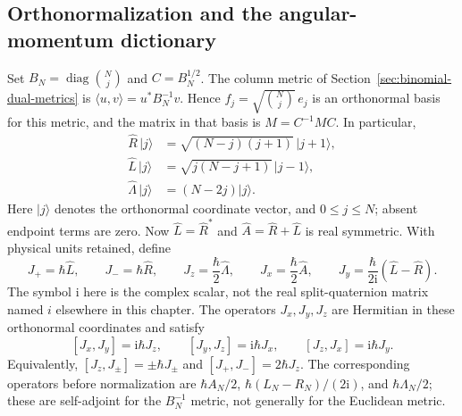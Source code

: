 \subsection{Orthonormalization and the angular-momentum dictionary}
Set $B_N=\operatorname{diag}\binom Nj$ and $C=B_N^{1/2}$. The column metric of Section~\ref{sec:binomial-dual-metrics} is $\langle u,v\rangle=u^*B_N^{-1}v$. Hence $f_j=\sqrt{\binom Nj}\,e_j$ is an orthonormal basis for this metric, and the matrix in that basis is $\widehat M=C^{-1}MC$. In particular,
\begin{align*}
\widehat R\,|j\rangle&=\sqrt{(N-j)(j+1)}\,|j+1\rangle,\\
\widehat L\,|j\rangle&=\sqrt{j(N-j+1)}\,|j-1\rangle,\\
\widehat\Lambda\,|j\rangle&=(N-2j)|j\rangle.
\end{align*}
Here $|j\rangle$ denotes the orthonormal coordinate vector, and $0\le j\le N$; absent endpoint terms are zero. Now $\widehat L=\widehat R^*$ and $\widehat A=\widehat R+\widehat L$ is real symmetric. With physical units retained, define
\begin{equation}\label{eq:angular-dictionary}
J_+=\hbar\widehat L,\qquad J_-=\hbar\widehat R,\qquad
J_z=\frac\hbar2\widehat\Lambda,\qquad
J_x=\frac\hbar2\widehat A,\qquad
J_y=\frac{\hbar}{2\mathrm i}(\widehat L-\widehat R).
\end{equation}
The symbol $\mathrm i$ here is the complex scalar, not the real split-quaternion matrix named $i$ elsewhere in this chapter. The operators $J_x,J_y,J_z$ are Hermitian in these orthonormal coordinates and satisfy
\[
[J_x,J_y]=\mathrm i\hbar J_z,\qquad
[J_y,J_z]=\mathrm i\hbar J_x,\qquad
[J_z,J_x]=\mathrm i\hbar J_y.
\]
Equivalently, $[J_z,J_\pm]=\pm\hbar J_\pm$ and $[J_+,J_-]=2\hbar J_z$.
The corresponding operators before normalization are $\hbar A_N/2$, $\hbar(L_N-R_N)/(2\mathrm i)$, and $\hbar\Lambda_N/2$; these are self-adjoint for the $B_N^{-1}$ metric, not generally for the Euclidean metric.

